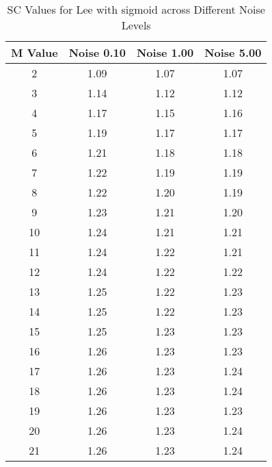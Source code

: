 \begin{table}[htb]
\small
\centering
\begin{tabular}{|c|c|c|c|} \hline
M Value & Noise 0.10 & Noise 1.00 & Noise 5.00 \\ \hline
2 & 1.09 & 1.07 & 1.07 \\ \hline
3 & 1.14 & 1.12 & 1.12 \\ \hline
4 & 1.17 & 1.15 & 1.16 \\ \hline
5 & 1.19 & 1.17 & 1.17 \\ \hline
6 & 1.21 & 1.18 & 1.18 \\ \hline
7 & 1.22 & 1.19 & 1.19 \\ \hline
8 & 1.22 & 1.20 & 1.19 \\ \hline
9 & 1.23 & 1.21 & 1.20 \\ \hline
10 & 1.24 & 1.21 & 1.21 \\ \hline
11 & 1.24 & 1.22 & 1.21 \\ \hline
12 & 1.24 & 1.22 & 1.22 \\ \hline
13 & 1.25 & 1.22 & 1.23 \\ \hline
14 & 1.25 & 1.22 & 1.23 \\ \hline
15 & 1.25 & 1.23 & 1.23 \\ \hline
16 & 1.26 & 1.23 & 1.23 \\ \hline
17 & 1.26 & 1.23 & 1.24 \\ \hline
18 & 1.26 & 1.23 & 1.24 \\ \hline
19 & 1.26 & 1.23 & 1.23 \\ \hline
20 & 1.26 & 1.23 & 1.24 \\ \hline
21 & 1.26 & 1.23 & 1.24 \\ \hline
\end{tabular}
\caption{SC Values for Lee with sigmoid across Different Noise Levels}
\end{table}

